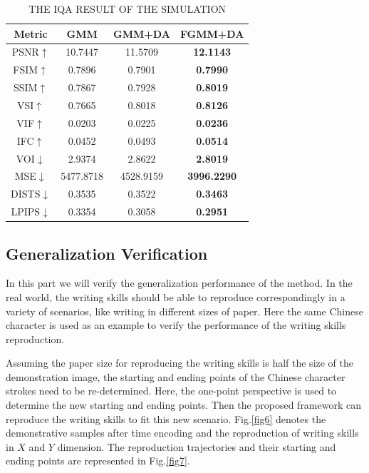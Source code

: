 \documentclass[conference]{IEEEtran}
\begin{document}
\begin{table}[!t]
    \centering  
    \caption{THE IQA RESULT OF THE SIMULATION}
    \label{tab2}
    \begin{tabular}{cccc}
    \toprule
    Metric & GMM & GMM+DA & \textbf{FGMM+DA} \\
    \midrule
    PSNR$\uparrow$ & 10.7447 & 11.5709 & \textbf{12.1143} \\
    FSIM$\uparrow$ & 0.7896 & 0.7901 & \textbf{0.7990} \\
    SSIM$\uparrow$ & 0.7867 & 0.7928 & \textbf{0.8019} \\
    VSI$\uparrow$ & 0.7665 & 0.8018 & \textbf{0.8126} \\
    VIF$\uparrow$ & 0.0203 & 0.0225 & \textbf{0.0236} \\
    IFC$\uparrow$ & 0.0452 & 0.0493 & \textbf{0.0514} \\
    VOI$\downarrow$ & 2.9374 & 2.8622 & \textbf{2.8019} \\
    MSE$\downarrow$ & 5477.8718 & 4528.9159 & \textbf{3996.2290} \\
    DISTS$\downarrow$ & 0.3535 & 0.3522 & \textbf{0.3463} \\
    LPIPS$\downarrow$ & 0.3354 & 0.3058 & \textbf{0.2951} \\
    \bottomrule
    \end{tabular}
\end{table}

\subsection{Generalization Verification}
In this part we will verify the generalization performance of the method. In the real world, the writing skills should be able to reproduce correspondingly in a variety of scenarios, like writing in different sizes of paper. Here the same Chinese character is used as an example to verify the performance of the writing skills reproduction.

Assuming the paper size for reproducing the writing skills is half the size of the demonstration image, the starting and ending points of the Chinese character strokes need to be re-determined. Here, the one-point perspective is used to determine the new starting and ending points. Then the proposed framework can reproduce the writing skills to fit this new scenario. Fig.\ref{fig6} denotes the demonstrative samples after time encoding and the reproduction of writing skills in $X$ and $Y$ dimension. The reproduction trajectories and their starting and ending points are represented in Fig.\ref{fig7}.
\end{document}
